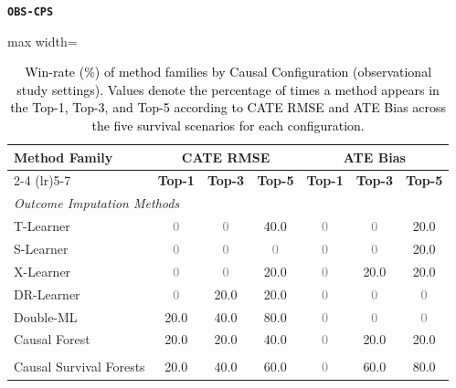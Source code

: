 \documentclass{article} %
\newcommand{\rebuttal}[1]{\textcolor{black}{#1}}
\begin{document}
\begin{table}[t]
\centering
\caption{\rebuttal{Win-rate (\%) of method families by Causal Configuration (observational study settings). 
Values denote the percentage of times a method appears in the Top-1, Top-3, and Top-5 according to CATE RMSE and ATE Bias across the five survival scenarios for each configuration. }}
\label{tab:winrate-obs-configs}

\begin{minipage}{0.48\textwidth}
\centering
\textbf{\texttt{OBS-CPS}}\\[0.25em]
\begin{adjustbox}{max width=\textwidth}
\begin{tabular}{lccc@{\hspace{18pt}}ccc}
\toprule
\multirow{2}{*}{\textbf{Method Family}} &
\multicolumn{3}{c}{\textbf{CATE RMSE}} &
\multicolumn{3}{c}{\textbf{ATE Bias}} \\
\cmidrule(lr){2-4} \cmidrule(lr){5-7}
& \textbf{Top-1} & \textbf{Top-3} & \textbf{Top-5}
& \textbf{Top-1} & \textbf{Top-3} & \textbf{Top-5} \\
\midrule
\multicolumn{7}{l}{\textit{Outcome Imputation Methods}} \\
T-Learner               & \textcolor{gray}{0}   & \textcolor{gray}{0}   & 40.0 & \textcolor{gray}{0}   & \textcolor{gray}{0}   & 20.0 \\
S-Learner               & \textcolor{gray}{0}   & \textcolor{gray}{0}   & \textcolor{gray}{0}   & \textcolor{gray}{0}   & \textcolor{gray}{0}   & 20.0 \\
X-Learner               & \textcolor{gray}{0}   & \textcolor{gray}{0}   & 20.0 & \textcolor{gray}{0}   & 20.0 & 20.0 \\
DR-Learner              & \textcolor{gray}{0}   & 20.0 & 20.0 & \textcolor{gray}{0}   & \textcolor{gray}{0}   & \textcolor{gray}{0} \\
Double-ML               & 20.0 & 40.0 & 80.0 & \textcolor{gray}{0}   & \textcolor{gray}{0}   & \textcolor{gray}{0} \\
Causal Forest           & 20.0 & 20.0 & 40.0 & \textcolor{gray}{0}   & 20.0 & 20.0 \\
\addlinespace %
\multicolumn{7}{l}{\textit{Direct-Survival CATE Methods}} \\
Causal Survival Forests  & 20.0 & 40.0 & 60.0 & \textcolor{gray}{0}   & 60.0 & 80.0 \\

\end{tabular}
\end{adjustbox}
\end{minipage}
\end{table}
\end{document}

